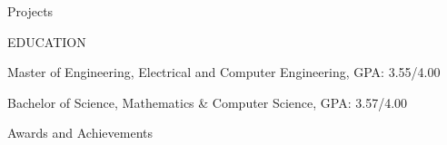 \documentclass[10pt]{article}
\begin{document}
\begin{customsection}{Projects}
\end{customsection}

\begin{customsection}{EDUCATION}

    {Master of Engineering, Electrical and Computer Engineering, GPA: 3.55/4.00}

    {Bachelor of Science, Mathematics \& Computer Science, GPA: 3.57/4.00}

\end{customsection}
 
\begin{customsectionnoskip}{Awards and Achievements}


\end{customsectionnoskip}

\end{document}

